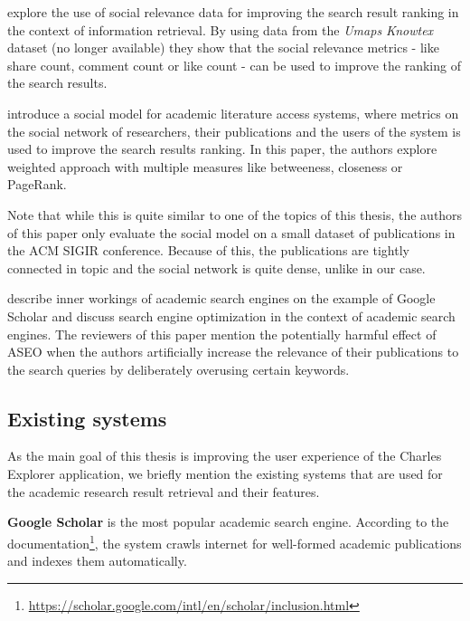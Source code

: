 \cite{social-relevance-for-re-ranking-documents} explore the use of social relevance data for improving the search result ranking in the context of information retrieval.
By using data from the \textit{Umaps Knowtex} dataset (no longer available) they show that the social relevance metrics - like share count, comment count or like count - can be used to improve the ranking of the search results.

\cite{social-model-literature-access} introduce a social model for academic literature access systems, 
where metrics on the social network of researchers, their publications and the users of the system is used to improve 
the search results ranking. In this paper, the authors explore weighted approach with multiple measures like betweeness, closeness or PageRank.

Note that while this is quite similar to one of the topics of this thesis, the authors of this paper
only evaluate the social model on a small dataset of publications in the \ac{ACM} \ac{SIGIR} conference.
Because of this, the publications are tightly connected in topic and the social network is quite dense, unlike in our case.

\cite{aseo} describe inner workings of academic search engines on the example of Google Scholar and
discuss search engine optimization in the context of academic search engines. 
The reviewers of this paper mention the potentially harmful effect of \ac{ASEO} when the authors artificially increase 
the relevance of their publications to the search queries by deliberately overusing certain keywords.

\subsection*{Existing systems}

As the main goal of this thesis is improving the user experience of the Charles Explorer application,
we briefly mention the existing systems that are used for the academic research result retrieval and their features.

\textbf{Google Scholar} is the most popular academic search engine.
According to the documentation\footnote{\url{https://scholar.google.com/intl/en/scholar/inclusion.html}}, the system crawls internet for well-formed academic publications and indexes them automatically. 





